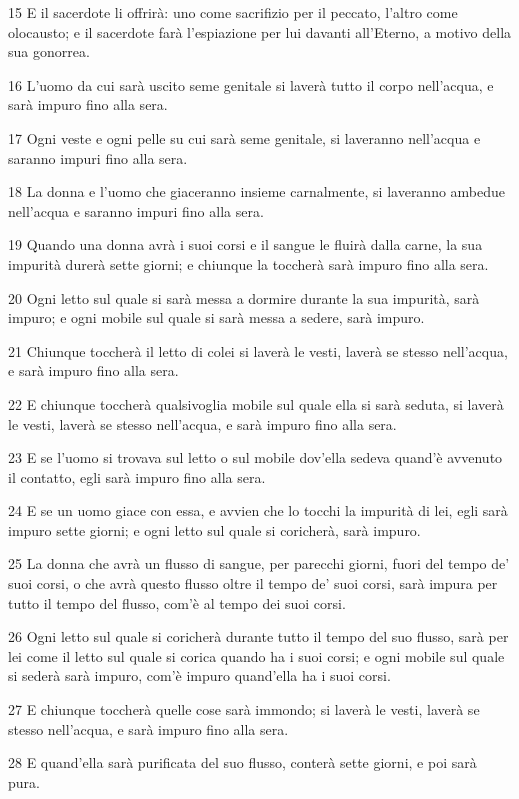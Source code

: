 \par 15 E il sacerdote li offrirà: uno come sacrifizio per il peccato, l'altro come olocausto; e il sacerdote farà l'espiazione per lui davanti all'Eterno, a motivo della sua gonorrea.
\par 16 L'uomo da cui sarà uscito seme genitale si laverà tutto il corpo nell'acqua, e sarà impuro fino alla sera.
\par 17 Ogni veste e ogni pelle su cui sarà seme genitale, si laveranno nell'acqua e saranno impuri fino alla sera.
\par 18 La donna e l'uomo che giaceranno insieme carnalmente, si laveranno ambedue nell'acqua e saranno impuri fino alla sera.
\par 19 Quando una donna avrà i suoi corsi e il sangue le fluirà dalla carne, la sua impurità durerà sette giorni; e chiunque la toccherà sarà impuro fino alla sera.
\par 20 Ogni letto sul quale si sarà messa a dormire durante la sua impurità, sarà impuro; e ogni mobile sul quale si sarà messa a sedere, sarà impuro.
\par 21 Chiunque toccherà il letto di colei si laverà le vesti, laverà se stesso nell'acqua, e sarà impuro fino alla sera.
\par 22 E chiunque toccherà qualsivoglia mobile sul quale ella si sarà seduta, si laverà le vesti, laverà se stesso nell'acqua, e sarà impuro fino alla sera.
\par 23 E se l'uomo si trovava sul letto o sul mobile dov'ella sedeva quand'è avvenuto il contatto, egli sarà impuro fino alla sera.
\par 24 E se un uomo giace con essa, e avvien che lo tocchi la impurità di lei, egli sarà impuro sette giorni; e ogni letto sul quale si coricherà, sarà impuro.
\par 25 La donna che avrà un flusso di sangue, per parecchi giorni, fuori del tempo de' suoi corsi, o che avrà questo flusso oltre il tempo de' suoi corsi, sarà impura per tutto il tempo del flusso, com'è al tempo dei suoi corsi.
\par 26 Ogni letto sul quale si coricherà durante tutto il tempo del suo flusso, sarà per lei come il letto sul quale si corica quando ha i suoi corsi; e ogni mobile sul quale si sederà sarà impuro, com'è impuro quand'ella ha i suoi corsi.
\par 27 E chiunque toccherà quelle cose sarà immondo; si laverà le vesti, laverà se stesso nell'acqua, e sarà impuro fino alla sera.
\par 28 E quand'ella sarà purificata del suo flusso, conterà sette giorni, e poi sarà pura.
